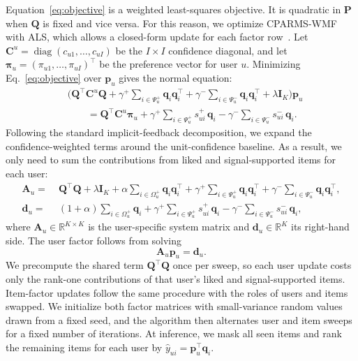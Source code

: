 \documentclass[pdflatex,sn-vancouver-num]{sn-jnl}%
\theoremstyle{thmstyleone}%
\theoremstyle{thmstyletwo}%
\theoremstyle{thmstylethree}%
\begin{document}
Equation~\eqref{eq:objective} is a weighted least-squares objective. It is quadratic in $\mathbf{P}$ when $\mathbf{Q}$ is fixed and vice versa. For this reason, we optimize CPARMS-WMF with ALS, which allows a closed-form update for each factor row~\cite{hu2008implicit}. Let $\mathbf{C}^{u} = \operatorname{diag}(c_{u1}, \dots, c_{uI})$ be the $I\times I$ confidence diagonal, and let $\boldsymbol{\pi}_u=(\pi_{u1},\ldots,\pi_{uI})^\top$ be the preference vector for user $u$. Minimizing Eq.~\eqref{eq:objective} over $\mathbf{p}_u$ gives the normal equation:
\begin{equation}
\begin{aligned}
&\Big(
\mathbf{Q}^{\top}\mathbf{C}^{u}\mathbf{Q}
+ \gamma^{+} \!\sum_{i \in \Psi_u^{+}}\!\mathbf{q}_i\mathbf{q}_i^{\top}
+ \gamma^{-} \!\sum_{i \in \Psi_u^{-}}\!\mathbf{q}_i\mathbf{q}_i^{\top}
+ \lambda \mathbf{I}_{K}
\Big)\mathbf{p}_u \\
&\qquad=
\mathbf{Q}^{\top}\mathbf{C}^{u}\boldsymbol{\pi}_u
+ \gamma^{+} \!\sum_{i \in \Psi_u^{+}}\! s^{+}_{ui}\,\mathbf{q}_i
- \gamma^{-} \!\sum_{i \in \Psi_u^{-}}\! s^{-}_{ui}\,\mathbf{q}_i .
\end{aligned}
\label{eq:normal_full}
\end{equation}
Following the standard implicit-feedback decomposition, we expand the confidence-weighted terms around the unit-confidence baseline. As a result, we only need to sum the contributions from liked and signal-supported items for each user:
\begin{equation}
\begin{aligned}
\mathbf{A}_u =\;& \mathbf{Q}^{\top}\mathbf{Q} + \lambda \mathbf{I}_{K}
+ \alpha \!\!\sum_{i \in \Omega_u^{+}}\!\! \mathbf{q}_i\mathbf{q}_i^{\top}
+ \gamma^{+} \!\sum_{i \in \Psi_u^{+}}\! \mathbf{q}_i\mathbf{q}_i^{\top}
+ \gamma^{-} \!\sum_{i \in \Psi_u^{-}}\! \mathbf{q}_i\mathbf{q}_i^{\top}, \\[2pt]
\mathbf{d}_u =\;& (1+\alpha)\!\!\sum_{i \in \Omega_u^{+}}\!\!\mathbf{q}_i
+ \gamma^{+} \!\sum_{i \in \Psi_u^{+}}\! s^{+}_{ui}\,\mathbf{q}_i
- \gamma^{-} \!\sum_{i \in \Psi_u^{-}}\! s^{-}_{ui}\,\mathbf{q}_i,
\end{aligned}
\label{eq:als_accum}
\end{equation}
where $\mathbf{A}_u\in\mathbb{R}^{K\times K}$ is the user-specific system matrix and $\mathbf{d}_u\in\mathbb{R}^{K}$ its right-hand side. The user factor follows from solving
\begin{equation}
\mathbf{A}_u\mathbf{p}_u = \mathbf{d}_u .
\label{eq:user_update}
\end{equation}
We precompute the shared term $\mathbf{Q}^{\top}\mathbf{Q}$ once per sweep, so each user update costs only the rank-one contributions of that user's liked and signal-supported items. Item-factor updates follow the same procedure with the roles of users and items swapped. We initialize both factor matrices with small-variance random values drawn from a fixed seed, and the algorithm then alternates user and item sweeps for a fixed number of iterations. At inference, we mask all seen items and rank the remaining items for each user by $\hat{y}_{ui} = \mathbf{p}_u^{\top}\mathbf{q}_i$.
\end{document}
